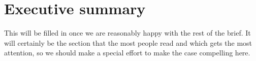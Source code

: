
		\section{Executive summary}

\begin{vcom}
This will be filled in once we are reasonably happy with the rest of the brief. It will certainly be the section that the most people read and which gets the most attention, so we should make a special effort to make the case compelling here.
\end{vcom}

